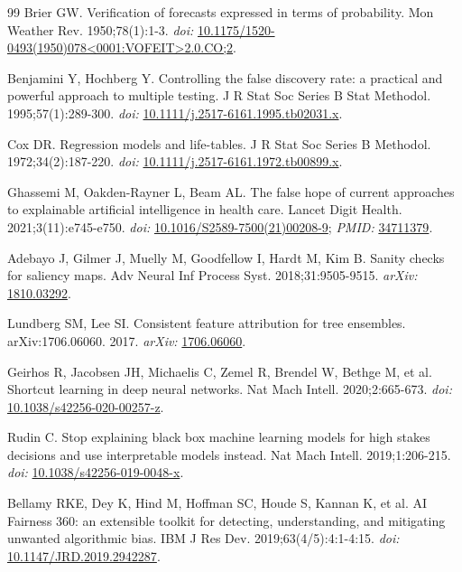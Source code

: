\documentclass[10pt,twocolumn,letterpaper]{article}
\begin{document}
\begin{thebibliography}{99}
Brier GW. Verification of forecasts expressed in terms of probability. Mon Weather Rev. 1950;78(1):1-3. \textit{doi:} \href{https://doi.org/10.1175/1520-0493(1950)078\%3C0001:VOFEIT\%3E2.0.CO;2}{10.1175/1520-0493(1950)078<0001:VOFEIT>2.0.CO;2}.

Benjamini Y, Hochberg Y. Controlling the false discovery rate: a practical and powerful approach to multiple testing. J R Stat Soc Series B Stat Methodol. 1995;57(1):289-300. \textit{doi:} \href{https://doi.org/10.1111/j.2517-6161.1995.tb02031.x}{10.1111/j.2517-6161.1995.tb02031.x}.

Cox DR. Regression models and life-tables. J R Stat Soc Series B Methodol. 1972;34(2):187-220. \textit{doi:} \href{https://doi.org/10.1111/j.2517-6161.1972.tb00899.x}{10.1111/j.2517-6161.1972.tb00899.x}.

Ghassemi M, Oakden-Rayner L, Beam AL. The false hope of current approaches to explainable artificial intelligence in health care. Lancet Digit Health. 2021;3(11):e745-e750. \textit{doi:} \href{https://doi.org/10.1016/S2589-7500(21)00208-9}{10.1016/S2589-7500(21)00208-9}; \textit{PMID:} \href{https://pubmed.ncbi.nlm.nih.gov/34711379/}{34711379}.

Adebayo J, Gilmer J, Muelly M, Goodfellow I, Hardt M, Kim B. Sanity checks for saliency maps. Adv Neural Inf Process Syst. 2018;31:9505-9515. \textit{arXiv:} \href{https://arxiv.org/abs/1810.03292}{1810.03292}.

Lundberg SM, Lee SI. Consistent feature attribution for tree ensembles. arXiv:1706.06060. 2017. \textit{arXiv:} \href{https://arxiv.org/abs/1706.06060}{1706.06060}.

Geirhos R, Jacobsen JH, Michaelis C, Zemel R, Brendel W, Bethge M, et al. Shortcut learning in deep neural networks. Nat Mach Intell. 2020;2:665-673. \textit{doi:} \href{https://doi.org/10.1038/s42256-020-00257-z}{10.1038/s42256-020-00257-z}.

Rudin C. Stop explaining black box machine learning models for high stakes decisions and use interpretable models instead. Nat Mach Intell. 2019;1:206-215. \textit{doi:} \href{https://doi.org/10.1038/s42256-019-0048-x}{10.1038/s42256-019-0048-x}.

Bellamy RKE, Dey K, Hind M, Hoffman SC, Houde S, Kannan K, et al. AI Fairness 360: an extensible toolkit for detecting, understanding, and mitigating unwanted algorithmic bias. IBM J Res Dev. 2019;63(4/5):4:1-4:15. \textit{doi:} \href{https://doi.org/10.1147/JRD.2019.2942287}{10.1147/JRD.2019.2942287}.


\end{thebibliography}
\end{document}
